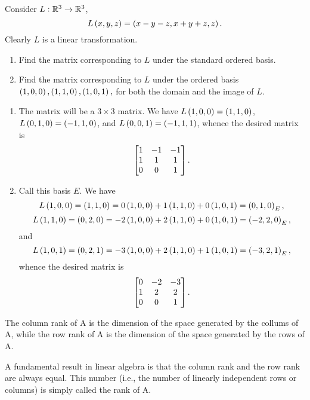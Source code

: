 
\begin{exa}
Consider $L:\mathbb{R}^3 \rightarrow \mathbb{R}^3$,
$$L\left( x , y , z \right) = \left( x - y - z , x + y + z , z  \right) .$$
Clearly $L$ is a linear transformation.
\begin{enumerate}
 \item  Find the
matrix corresponding to $L$ under the standard ordered basis.
\item Find
the matrix corresponding to $L$ under the ordered basis $\left( 1 , 0 ,
0 \right), \left( 1 , 1 , 0 \right), \left( 1 , 0
, 1 \right),$ for both the domain and the image of $L$.

\end{enumerate}
\end{exa}
\begin{solu}
\begin{enumerate}
\item The matrix will be a $3\times 3$ matrix. We have $L\left(  1 , 0  , 0  \right) = \left(  1 , 1 ,
0  \right)$, $L\left(  0 , 1 , 0  \right) = \left(  -1 , 1 , 0 \right)$, and $L\left( 0 ,
0, 1 \right) = \left( -1 , 1 , 1 \right)$, whence the desired matrix is
$$\begin{bmatrix} 1 & -1 & -1 \cr 1 & 1 & 1 \cr 0 & 0 & 1 \cr\end{bmatrix}.$$
\item Call this basis ${E}$. We have
$$L\left(  1 , 0  , 0  \right) = \left(  1 , 1 ,
0  \right) = 0 \left(  1 , 0 ,
0  \right) + 1\left(  1 , 1 ,
0  \right) + 0\left(  1 , 0 ,
1  \right) = \left(  0 , 1 ,
0  \right)_{E},$$ $$L\left(  1, 1 , 0  \right) = \left(  0 , 2 , 0 \right) = -2\left(  1 , 0 ,
0  \right) + 2\left(  1 , 1 ,
0  \right) + 0\left(  1 , 0 ,
1  \right) = \left(  -2 , 2 ,
0  \right)_{E},$$ and $$L\left( 1 ,
0, 1 \right) = \left( 0 , 2 , 1 \right) = -3\left(  1 , 0 ,
0  \right) + 2\left(  1 , 1 ,
0  \right)+ 1\left(  1 , 0 ,
1 \right) = \left(  -3 , 2 ,
1  \right)_{E},$$ whence the desired matrix is
$$\begin{bmatrix} 0 & -2 & -3 \cr 1 & 2 & 2 \cr 0 & 0 & 1 \cr\end{bmatrix}.$$
\end{enumerate}
\end{solu}


\begin{df}
 The column rank of A is the dimension of the  space generated by the collums  of A, while the row rank of A is the dimension of the space generated by  the rows of A.
\end{df}

A fundamental result in linear algebra is that the column rank and the row rank are always equal.  This number (i.e., the number of linearly independent rows or columns) is simply called the rank of A.





